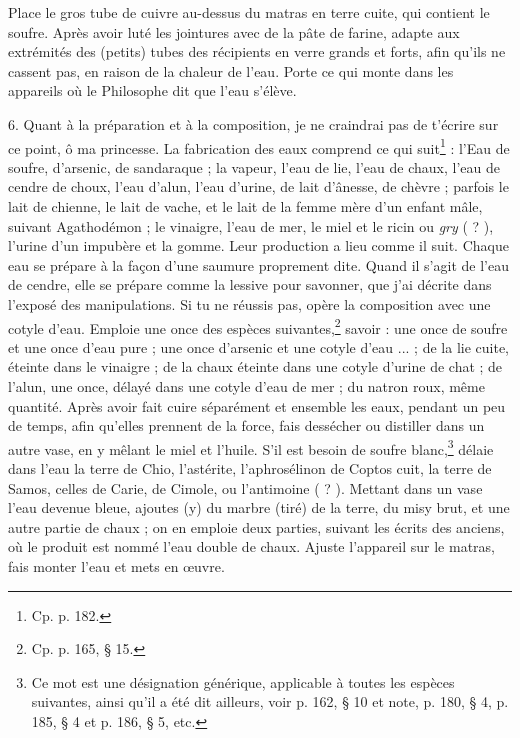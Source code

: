 \documentclass[a4paper, 11pt, oneside, polutonikogreek, french]{article}
\begin{document}
Place le gros tube de cuivre au-dessus du matras en terre cuite, qui contient le soufre. Après avoir luté les jointures avec de la pâte de farine, adapte aux extrémités des (petits) tubes des récipients en verre grands et forts, afin qu'ils ne cassent pas, en raison de la chaleur de l'eau. Porte ce qui monte dans les appareils où le Philosophe dit que l'eau s'élève.

6. Quant à la préparation et à la composition, je ne craindrai pas de t'écrire sur ce point, ô ma princesse. La fabrication des eaux comprend ce qui suit\footnote{Cp. p. 182.} : l'Eau de soufre, d'arsenic, de sandaraque ; la vapeur, l'eau de lie, l'eau de chaux, l'eau de cendre de choux, l'eau d'alun, l'eau d'urine, de lait d'ânesse, de chèvre ; parfois le lait de chienne, le lait de vache, et le lait de la femme mère d'un enfant mâle, suivant Agathodémon ; le vinaigre, l'eau de mer, le miel et le ricin ou \emph{gry} ( ? ), l'urine d'un impubère et la gomme. Leur production a lieu comme il suit. Chaque eau se prépare à la façon d'une saumure proprement dite. Quand il s'agit de l'eau de cendre, elle se prépare comme la lessive pour savonner, que j'ai décrite dans l'exposé des manipulations. Si tu ne réussis pas, opère la composition avec une cotyle d'eau. Emploie une once des espèces suivantes,\footnote{Cp. p. 165, § 15.} savoir : une once de soufre et une once d'eau pure ; une once d'arsenic et une cotyle d'eau ... ; de la lie cuite, éteinte dans le vinaigre ; de la chaux éteinte dans une cotyle d'urine de chat ; de l'alun, une once, délayé dans une cotyle d'eau de mer ; du natron roux, même quantité. Après avoir fait cuire séparément et ensemble les eaux, pendant un peu de temps, afin qu'elles prennent de la force, fais dessécher ou distiller dans un autre vase, en y mêlant le miel et l'huile. S'il est besoin de soufre blanc,\footnote{Ce mot est une désignation générique, applicable à toutes les espèces suivantes, ainsi qu'il a été dit ailleurs, voir p. 162, § 10 et note, p. 180, § 4, p. 185, § 4 et p. 186, § 5, etc.} délaie dans l'eau la terre de Chio, l'astérite, l'aphrosélinon de Coptos cuit, la terre de Samos, celles de Carie, de Cimole, ou l'antimoine ( ? ). Mettant dans un vase l'eau devenue bleue, ajoutes (y) du marbre (tiré) de la terre, du misy brut, et une autre partie de chaux ; on en emploie deux parties, suivant les écrits des anciens, où le produit est nommé l'eau double de chaux. Ajuste l'appareil sur le matras, fais monter l'eau et mets en œuvre.
\end{document}

